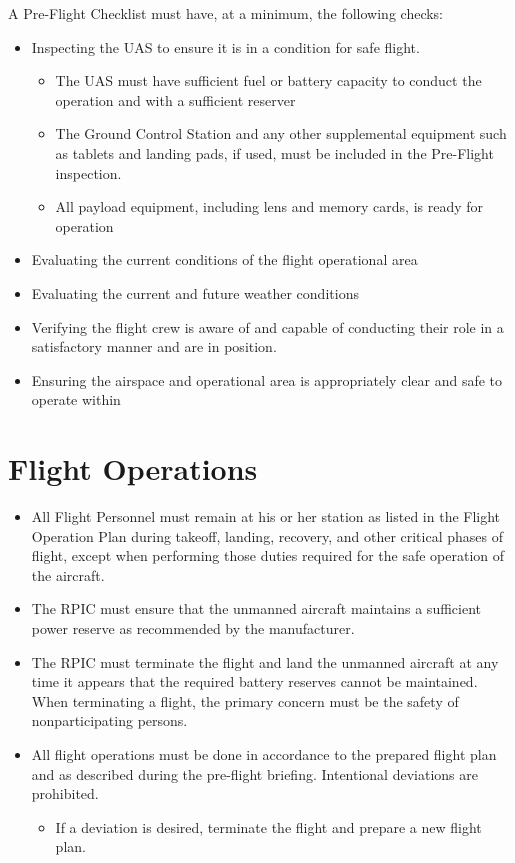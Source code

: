 \documentclass[
]{book}
\providecommand{\tightlist}{%
  \setlength{\itemsep}{0pt}\setlength{\parskip}{0pt}}
\begin{document}
A Pre-Flight Checklist must have, at a minimum, the following checks:

\begin{itemize}
\item
  Inspecting the UAS to ensure it is in a condition for safe flight.

  \begin{itemize}
  \tightlist
  \item
    The UAS must have sufficient fuel or battery capacity to conduct the operation and with a sufficient reserver
  \item
    The Ground Control Station and any other supplemental equipment such as tablets and landing pads, if used, must be included in the Pre-Flight inspection.
  \item
    All payload equipment, including lens and memory cards, is ready for operation
  \end{itemize}
\item
  Evaluating the current conditions of the flight operational area
\item
  Evaluating the current and future weather conditions
\item
  Verifying the flight crew is aware of and capable of conducting their role in a satisfactory manner and are in position.
\item
  Ensuring the airspace and operational area is appropriately clear and safe to operate within
\end{itemize}

\section{Flight Operations}\label{flight-operations}

\begin{itemize}
\item
  All Flight Personnel must remain at his or her station as listed in the Flight Operation Plan during takeoff, landing, recovery, and other critical phases of flight, except when performing those duties required for the safe operation of the aircraft.
\item
  The RPIC must ensure that the unmanned aircraft maintains a sufficient power reserve as recommended by the manufacturer.
\item
  The RPIC must terminate the flight and land the unmanned aircraft at any time it appears that the required battery reserves cannot be maintained. When terminating a flight, the primary concern must be the safety of nonparticipating persons.
\item
  All flight operations must be done in accordance to the prepared flight plan and as described during the pre-flight briefing. Intentional deviations are prohibited.

  \begin{itemize}
  \tightlist
  \item
    If a deviation is desired, terminate the flight and prepare a new flight plan.
  \end{itemize}
\end{itemize}
\end{document}
